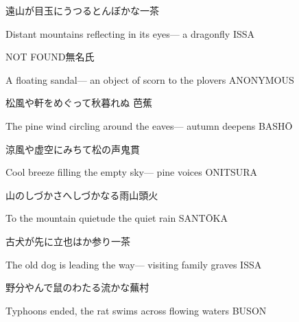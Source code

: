 \begin{haiku}
    {\FH 遠山が目玉にうつるとんぼかな}\hfill{\FH 一茶}

    \vin{} Distant mountains
    \vin{} \vin{} reflecting in its eyes---
    \vin{} \vin{} \vin{} a dragonfly \hspace{\fill} ISSA
\end{haiku}

\begin{haiku}
    NOT FOUND\hfill{\FH 無名氏}

    \vin{} A floating sandal---
    \vin{} \vin{} an object of scorn
    \vin{} \vin{} \vin{} to the plovers \hspace{\fill} ANONYMOUS
\end{haiku}

\begin{haiku}
    {\FH 松風や軒をめぐって秋暮れぬ }\hfill{\FH 芭蕉}

    \vin{} The pine wind
    \vin{} \vin{} circling around the eaves---
    \vin{} \vin{} \vin{} autumn deepens \hspace{\fill} BASH\={O}
\end{haiku}

\begin{haiku}
    {\FH 涼風や虚空にみちて松の声}\hfill{\FH 鬼貫}

    \vin{} Cool breeze
    \vin{} \vin{} filling the empty sky---
    \vin{} \vin{} \vin{} pine voices \hspace{\fill} ONITSURA
\end{haiku}

\begin{haiku}
    {\FH 山のしづかさへしづかなる雨}\hfill{\FH 山頭火}

    \vin{} To the mountain quietude
    \vin{} \vin{} the quiet
    \vin{} \vin{} \vin{} rain \hspace{\fill} SANT\={O}KA
\end{haiku}

\begin{haiku}
    {\FH 古犬が先に立也はか参り}\hfill{\FH 一茶}

    \vin{} The old dog
    \vin{} \vin{} is leading the way---
    \vin{} \vin{} \vin{} visiting family graves \hspace{\fill} ISSA
\end{haiku}

\begin{haiku}
    {\FH 野分やんで鼠のわたる流かな}\hfill{\FH 蕪村}

    \vin{} Typhoons ended,
    \vin{} \vin{} the rat swims across
    \vin{} \vin{} \vin{} flowing waters \hspace{\fill} BUSON
\end{haiku}

